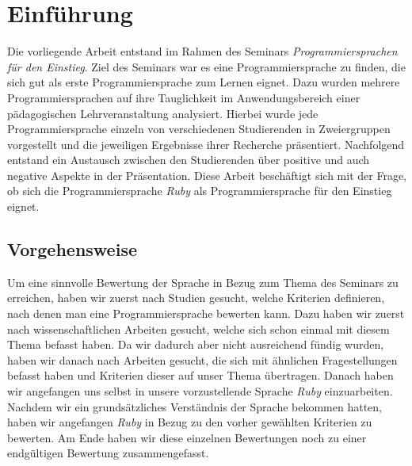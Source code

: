 \documentclass[12pt,DIV=14, version=first, BCOR=10mm,a4paper,twoside,parskip=half-,headsepline,headinclude]{scrartcl}
\begin{document}
\pagebreak

%



\section{Einführung}
\begin{flushleft}
Die vorliegende Arbeit entstand im Rahmen des Seminars \textit{\glqq Programmiersprachen für den Einstieg\grqq}. Ziel des Seminars war es eine Programmiersprache zu finden, die sich gut als erste Programmiersprache zum Lernen eignet. Dazu wurden mehrere Programmiersprachen auf ihre Tauglichkeit im Anwendungsbereich einer pädagogischen Lehrveranstaltung analysiert. Hierbei wurde jede Programmiersprache einzeln von verschiedenen Studierenden in Zweiergruppen vorgestellt und die jeweiligen Ergebnisse ihrer Recherche präsentiert. Nachfolgend entstand ein Austausch zwischen den Studierenden über positive und auch negative Aspekte in der Präsentation. Diese Arbeit beschäftigt sich mit der Frage, ob sich die Programmiersprache \textit{\glqq Ruby\grqq} als Programmiersprache für den Einstieg eignet.
\end{flushleft}

\subsection{Vorgehensweise}
\begin{flushleft}
Um eine sinnvolle Bewertung der Sprache in Bezug zum Thema des Seminars zu erreichen, haben wir zuerst nach Studien gesucht, welche Kriterien definieren, nach denen man eine Programmiersprache bewerten kann. Dazu haben wir zuerst nach wissenschaftlichen Arbeiten gesucht, welche sich schon einmal mit diesem Thema befasst haben. Da wir dadurch aber nicht ausreichend fündig wurden, haben wir danach nach Arbeiten gesucht, die sich mit ähnlichen Fragestellungen befasst haben und Kriterien dieser auf unser Thema übertragen. Danach haben wir angefangen uns selbst in unsere vorzustellende Sprache \textit{\glqq Ruby\grqq} einzuarbeiten. Nachdem wir ein grundsätzliches Verständnis der Sprache bekommen hatten, haben wir angefangen \textit{\glqq Ruby\grqq} in Bezug zu den vorher gewählten Kriterien zu bewerten. Am Ende haben wir diese einzelnen Bewertungen noch zu einer endgültigen Bewertung zusammengefasst.
\end{flushleft}
\end{document}
